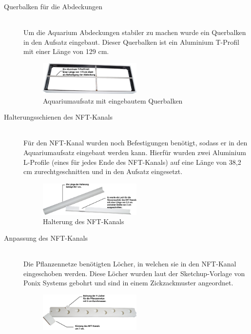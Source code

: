 \begin{description}
    \item [Querbalken für die Abdeckungen]\mbox{} \\
    Um die Aquarium Abdeckungen stabiler zu machen wurde ein Querbalken in den Aufsatz eingebaut. Dieser Querbalken ist ein Aluminium T-Profil mit einer Länge von 129 cm.
    \begin{figure}[ht]
        \centering
        \includegraphics[width=0.5\textwidth]{images/Aufsatz_Mod}
	    \caption{Aquariumaufsatz mit eingebautem Querbalken}
    \end{figure}
    \item [Halterungsschienen des \gls{NFT}-Kanals]\mbox{} \\
    Für den \gls{NFT}-Kanal wurden noch Befestigungen benötigt, sodass er in den Aquariumaufsatz eingebaut werden kann. Hierfür wurden zwei Aluminium L-Profile (eines für jedes Ende des \gls{NFT}-Kanals) auf eine Länge von 38,2 cm zurechtgeschnitten und in den Aufsatz eingesetzt.
    \begin{figure}[ht]
        \centering
        \includegraphics[width=0.5\textwidth]{images/NFT-Kanal_Halterung}
	    \caption{Halterung des \gls{NFT}-Kanals}
    \end{figure}
    \newpage
    \item [Anpassung des \gls{NFT}-Kanals]\mbox{} \\ 
    Die Pflanzennetze benötigten Löcher, in welchen sie in den \gls{NFT}-Kanal eingeschoben werden. Diese Löcher wurden laut der \gls{Sketchup}-Vorlage von Ponix Systems gebohrt und sind in einem Zickzackmuster angeordnet.\mbox{} \\
    \begin{figure}[ht]
        \centering
        \includegraphics[width=0.5\textwidth]{images/NFT-Kanal_Mod}

\end{figure}
\end{description}
